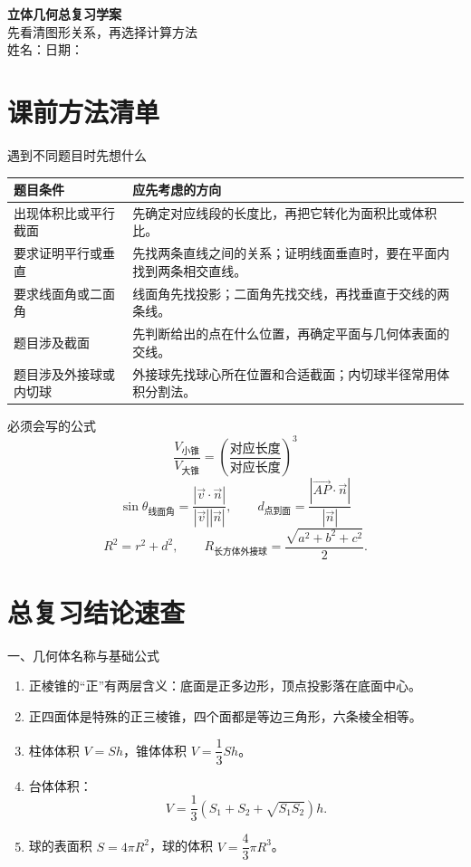 \documentclass[11pt,a4paper]{ctexart}
\begin{document}
\begin{center}
  {\Large\bfseries 立体几何总复习学案}\\[0.35em]
  {\large 先看清图形关系，再选择计算方法}\\[0.45em]
  姓名：\blank{2.8cm}\quad 日期：\blank{2.8cm}
\end{center}

\section{课前方法清单}

\begin{modelbox}{遇到不同题目时先想什么}
\renewcommand{\arraystretch}{1.45}
\begin{tabularx}{\textwidth}{p{3.8cm}X}
\toprule
题目条件 & 应先考虑的方向 \\
\midrule
出现体积比或平行截面 & 先确定对应线段的长度比，再把它转化为面积比或体积比。\\ \hline
要求证明平行或垂直 & 先找两条直线之间的关系；证明线面垂直时，要在平面内找到两条相交直线。\\ \hline
要求线面角或二面角 & 线面角先找投影；二面角先找交线，再找垂直于交线的两条线。\\ \hline
题目涉及截面 & 先判断给出的点在什么位置，再确定平面与几何体表面的交线。\\ \hline
题目涉及外接球或内切球 & 外接球先找球心所在位置和合适截面；内切球半径常用体积分割法。\\
\bottomrule
\end{tabularx}
\end{modelbox}

\begin{modelbox}{必须会写的公式}
\[
  \frac{V_{\text{小锥}}}{V_{\text{大锥}}}
  =
  \left(\frac{\text{对应长度}}{\text{对应长度}}\right)^3
\]
\[
  \sin\theta_{\text{线面角}}
  =
  \frac{|\vec v\cdot \vec n|}{|\vec v||\vec n|},
  \qquad
  d_{\text{点到面}}
  =
  \frac{|\overrightarrow{AP}\cdot \vec n|}{|\vec n|}
\]
\[
  R^2=r^2+d^2,
  \qquad
  R_{\text{长方体外接球}}
  =
  \frac{\sqrt{a^2+b^2+c^2}}{2}.
\]
\end{modelbox}

\section{总复习结论速查}

\begin{modelbox}{一、几何体名称与基础公式}
\begin{enumerate}[label=\arabic*. , leftmargin=2em, itemsep=0.25em]
  \item 正棱锥的“正”有两层含义：底面是正多边形，顶点投影落在底面中心。
  \item 正四面体是特殊的正三棱锥，四个面都是等边三角形，六条棱全相等。
  \item 柱体体积 \(V=Sh\)，锥体体积 \(V=\dfrac13Sh\)。
  \item 台体体积：
  \[
    V=\frac13\left(S_1+S_2+\sqrt{S_1S_2}\right)h.
  \]
  \item 球的表面积 \(S=4\pi R^2\)，球的体积 \(V=\dfrac43\pi R^3\)。
\end{enumerate}
\end{modelbox}
\end{document}
